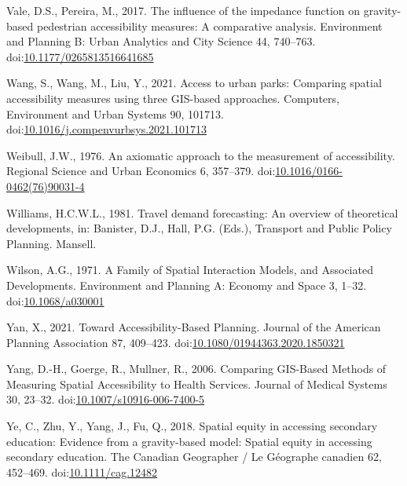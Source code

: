 \documentclass[]{elsarticle} %
\newlength{\cslhangindent}
\newlength{\cslentryspacingunit} %
\newenvironment{CSLReferences}[2] %
 {%
  \setlength{\parindent}{0pt}
  \ifodd #1
  \let\oldpar\par
  \def\par{\hangindent=\cslhangindent\oldpar}
  \fi
  \setlength{\parskip}{#2\cslentryspacingunit}
 }%
 {}
\begin{document}
\begin{CSLReferences}{1}{0}
\leavevmode{}%
Vale, D.S., Pereira, M., 2017. The influence of the impedance function
on gravity-based pedestrian accessibility measures: {A} comparative
analysis. Environment and Planning B: Urban Analytics and City Science
44, 740--763.
doi:\href{https://doi.org/10.1177/0265813516641685}{10.1177/0265813516641685}

\leavevmode{}%
Wang, S., Wang, M., Liu, Y., 2021. Access to urban parks: {Comparing}
spatial accessibility measures using three {GIS}-based approaches.
Computers, Environment and Urban Systems 90, 101713.
doi:\href{https://doi.org/10.1016/j.compenvurbsys.2021.101713}{10.1016/j.compenvurbsys.2021.101713}

\leavevmode{}%
Weibull, J.W., 1976. An axiomatic approach to the measurement of
accessibility. Regional Science and Urban Economics 6, 357--379.
doi:\href{https://doi.org/10.1016/0166-0462(76)90031-4}{10.1016/0166-0462(76)90031-4}

\leavevmode{}%
Williams, H.C.W.L., 1981. Travel demand forecasting: An overview of
theoretical developments, in: Banister, D.J., Hall, P.G. (Eds.),
Transport and Public Policy Planning. Mansell.

\leavevmode{}%
Wilson, A.G., 1971. A Family of Spatial Interaction Models, and
Associated Developments. Environment and Planning A: Economy and Space
3, 1--32. doi:\href{https://doi.org/10.1068/a030001}{10.1068/a030001}

\leavevmode{}%
Yan, X., 2021. Toward Accessibility-Based Planning. Journal of the
American Planning Association 87, 409--423.
doi:\href{https://doi.org/10.1080/01944363.2020.1850321}{10.1080/01944363.2020.1850321}

\leavevmode{}%
Yang, D.-H., Goerge, R., Mullner, R., 2006. Comparing {GIS}-{Based}
{Methods} of {Measuring} {Spatial} {Accessibility} to {Health}
{Services}. Journal of Medical Systems 30, 23--32.
doi:\href{https://doi.org/10.1007/s10916-006-7400-5}{10.1007/s10916-006-7400-5}

\leavevmode{}%
Ye, C., Zhu, Y., Yang, J., Fu, Q., 2018. Spatial equity in accessing
secondary education: {Evidence} from a gravity-based model: {Spatial}
equity in accessing secondary education. The Canadian Geographer / Le
Géographe canadien 62, 452--469.
doi:\href{https://doi.org/10.1111/cag.12482}{10.1111/cag.12482}

\end{CSLReferences}
\end{document}
